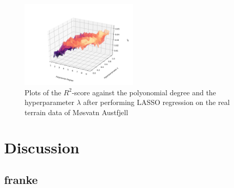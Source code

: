 \documentclass[a4paper,10pt,english]{article}
\begin{document}
\begin{figure}[H]
	\centering 
	\includegraphics[width = 0.5\textwidth, center]{../real_output/part_E_3.png}
	\caption{
		Plots of the $R^2$-score against the polyonomial degree and the hyperparameter $\lambda$ after performing LASSO regression on the real terrain data of Møsvatn Austfjell
	}
	\label{part_g_e3}
\end{figure}














\section{Discussion}
\label{sec:discussion}

\subsection{franke}
\end{document}
